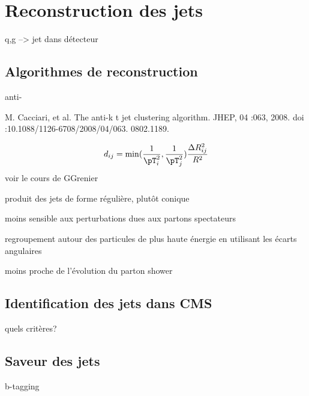 \section{Reconstruction des jets}\label{chapter-JERC-section-jets_reco}

q,g --> jet dans détecteur

\subsection{Algorithmes de reconstruction}\label{chapter-JERC-section-jets_reco-subsec-algo}

anti-\kT

M. Cacciari, et al. The anti-k t jet clustering algorithm. JHEP, 04 :063, 2008.
doi :10.1088/1126-6708/2008/04/063. 0802.1189.

\begin{equation}
d_{ij} = \min(\frac{1}{\pT^2_i}, \frac{1}{\pT^2_j}) \frac{\Delta R^2_{ij}}{R^2}
\end{equation}
voir le cours de GGrenier

produit des jets de forme régulière, plutôt conique

moins sensible aux perturbations dues aux partons spectateurs

regroupement autour des particules de plus haute énergie en utilisant les écarts angulaires

moins proche de l'évolution du parton shower

\subsection{Identification des jets dans CMS}\label{chapter-JERC-section-jets_reco-subsec-jetID}
quels critères?

\subsection{Saveur des jets}\label{chapter-JERC-section-jets_reco-subsec-flavor}
b-tagging
